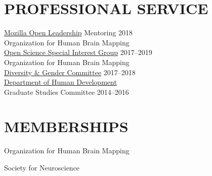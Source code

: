 \documentclass{dupre-cv}
\begin{document}
\section{PROFESSIONAL SERVICE}

\href{https://foundation.mozilla.org/en/opportunity/mozilla-open-leaders/round-6/}{Mozilla Open Leadership} Mentoring \hfill 2018 \\

Organization for Human Brain Mapping \\ \href{https://www.humanbrainmapping.org/i4a/pages/index.cfm?pageID=3712}{Open Science Special Interest Group}  \hfill 2017--2019 \\

Organization for Human Brain Mapping \\ \href{https://www.humanbrainmapping.org/i4a/pages/index.cfm?pageid=3313}{Diversity \& Gender Committee}  \hfill 2017--2018 \\

\href{http://www.human.cornell.edu/hd/}{Department of Human Development} \\ Graduate Studies Committee  \hfill 2014--2016 \\


\section{MEMBERSHIPS}

Organization for Human Brain Mapping
\vspace{5pt}

Society for Neuroscience
\end{document}
